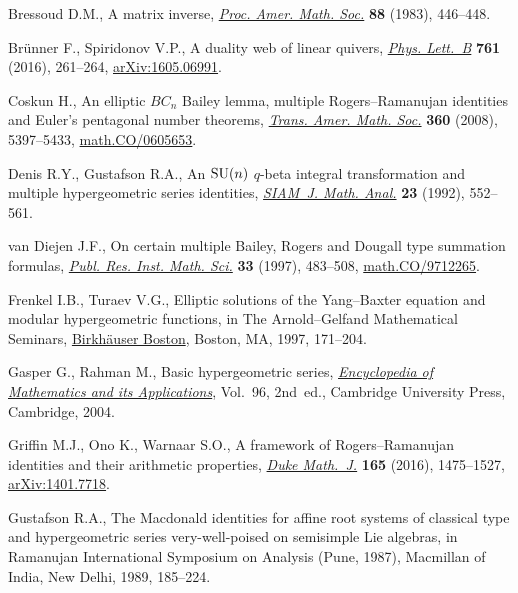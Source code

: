 \documentclass[pdftex]{sigma}
\numberwithin{equation}{section}
\begin{document}
\begin{thebibliography}{99}
Bressoud D.M., A matrix inverse, \href{https://doi.org/10.2307/2044991}{\textit{Proc. Amer. Math. Soc.}} \textbf{88}
 (1983), 446--448.

Br{\"u}nner F., Spiridonov V.P., A duality web of linear quivers, \href{https://doi.org/10.1016/j.physletb.2016.08.039}{\textit{Phys.
 Lett.~B}} \textbf{761} (2016), 261--264, \href{https://arxiv.org/abs/1605.06991}{arXiv:1605.06991}.

Coskun H., An elliptic {$BC_n$} {B}ailey lemma, multiple {R}ogers--{R}amanujan
 identities and {E}uler's pentagonal number theorems, \href{https://doi.org/10.1090/S0002-9947-08-04457-7}{\textit{Trans. Amer.
 Math. Soc.}} \textbf{360} (2008), 5397--5433, \href{https://arxiv.org/abs/math.CO/0605653}{math.CO/0605653}.

Denis R.Y., Gustafson R.A., An {${\rm SU}(n)$} {$q$}-beta integral
 transformation and multiple hypergeometric series identities, \href{https://doi.org/10.1137/0523027}{\textit{SIAM~J.
 Math. Anal.}} \textbf{23} (1992), 552--561.

van Diejen J.F., On certain multiple {B}ailey, {R}ogers and {D}ougall type
 summation formulas, \href{https://doi.org/10.2977/prims/1195145326}{\textit{Publ. Res. Inst. Math. Sci.}} \textbf{33} (1997),
 483--508, \href{https://arxiv.org/abs/math.CO/9712265}{math.CO/9712265}.

Frenkel I.B., Turaev V.G., Elliptic solutions of the {Y}ang--{B}axter equation
 and modular hypergeometric functions, in The {A}rnold--{G}elfand Mathematical
 Seminars, \href{https://doi.org/10.1007/978-1-4612-4122-5_9}{Birkh\"auser Boston}, Boston, MA, 1997, 171--204.

Gasper G., Rahman M., Basic hypergeometric series, \href{https://doi.org/10.1017/CBO9780511526251}{\textit{Encyclopedia of
 Mathematics and its Applications}}, Vol.~96, 2nd~ed., Cambridge University
 Press, Cambridge, 2004.

Griffin M.J., Ono K., Warnaar S.O., A framework of {R}ogers--{R}amanujan
 identities and their arithmetic properties, \href{https://doi.org/10.1215/00127094-3449994}{\textit{Duke Math.~J.}}
 \textbf{165} (2016), 1475--1527, \href{https://arxiv.org/abs/1401.7718}{arXiv:1401.7718}.

Gustafson R.A., The {M}acdonald identities for affine root systems of classical
 type and hypergeometric series very-well-poised on semisimple {L}ie algebras,
 in Ramanujan {I}nternational {S}ymposium on {A}nalysis ({P}une, 1987),
 Macmillan of India, New Delhi, 1989, 185--224.


\end{thebibliography}
\end{document}
